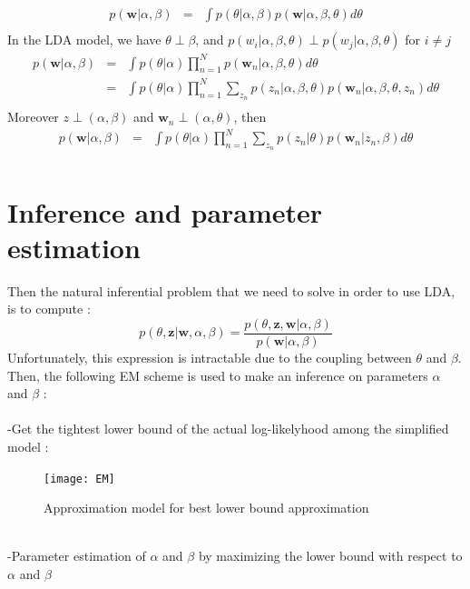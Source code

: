 \documentclass[12pt]{article}
\begin{document}
\begin{eqnarray*}
p(\textbf{w}|\alpha, \beta) &  = & \int p(\theta | \alpha, \beta)p(\textbf{w} | \alpha, \beta, \theta)d\theta\\
\end{eqnarray*}
In the LDA model, we have $ \theta \perp \beta$, and $p(w_{i} | \alpha, \beta, \theta) \perp p(w_{j} | \alpha, \beta, \theta)$  for $ i \neq j $
\begin{eqnarray*}
p(\textbf{w}|\alpha, \beta) & = & \int p(\theta | \alpha) \prod_{n=1}^{N} p(\textbf{w}_{n} | \alpha, \beta, \theta)d\theta\\
& = & \int  p(\theta |\alpha) \prod_{n=1}^{N}  \sum_{z_{n}}p(z_{n}|\alpha, \beta, \theta)p(\textbf{w}_{n} | \alpha, \beta, \theta, z_{n}) d\theta\\
\end{eqnarray*}
Moreover $z \perp (\alpha,\beta)$ and $\textbf{w}_{n} \perp (\alpha,\theta)$, then
\begin{eqnarray*}
p(\textbf{w}|\alpha, \beta) & = & \int p(\theta | \alpha)  \prod_{n=1}^{N}  \sum_{z_{n}}p(z_{n} |\theta)p(\textbf{w}_{n} | z_{n}, \beta) d\theta\\
\end{eqnarray*}

\section*{Inference and parameter estimation}
Then the natural inferential problem that we need to solve in order to use LDA, is to compute :
$$p(\theta, \textbf{z}|\textbf{w},\alpha,\beta)=\frac{p(\theta,\textbf{z},\textbf{w}|\alpha,\beta)}{p(\textbf{w}|\alpha,\beta)}$$
Unfortunately, this expression is intractable due to the coupling between $\theta$ and $\beta$.
Then, the following EM scheme is used to make an inference on parameters $\alpha$ and $\beta$ : ~\\
~\\
-Get the tightest lower bound of the actual log-likelyhood among the simplified model :~\\
\begin{figure}[!h]
\centering
\captionsetup{justification=centering,margin=2cm}
\texttt{[image: EM]}
\caption{Approximation model for best lower bound approximation}
\end{figure}
~\\
-Parameter estimation of $\alpha$ and $\beta$ by maximizing the lower bound with respect to $\alpha$ and $\beta$~\\
\end{document}
